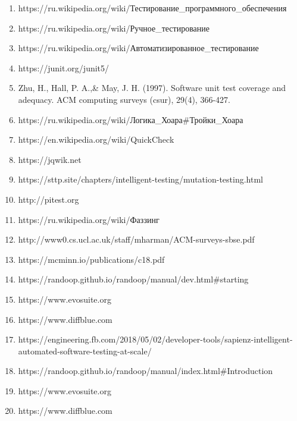 \begin{enumerate}

\item https://ru.wikipedia.org/wiki/Тестирование\_программного\_обеспечения
	
\item https://ru.wikipedia.org/wiki/Ручное\_тестирование

\item https://ru.wikipedia.org/wiki/Автоматизированное\_тестирование

\item https://junit.org/junit5/

\item Zhu, H., Hall, P. A.,\& May, J. H. (1997). Software unit test coverage and adequacy. ACM computing surveys (csur), 29(4), 366-427.

\item https://ru.wikipedia.org/wiki/Логика\_Хоара#Тройки\_Хоара

\item https://en.wikipedia.org/wiki/QuickCheck

\item https://jqwik.net

\item https://sttp.site/chapters/intelligent-testing/mutation-testing.html

\item http://pitest.org

\item https://ru.wikipedia.org/wiki/Фаззинг

\item http://www0.cs.ucl.ac.uk/staff/mharman/ACM-surveys-sbse.pdf

\item https://mcminn.io/publications/c18.pdf

\item https://randoop.github.io/randoop/manual/dev.html#starting

\item https://www.evosuite.org

\item https://www.diffblue.com

\item https://engineering.fb.com/2018/05/02/developer-tools/sapienz-intelligent-automated-software-testing-at-scale/

\item https://randoop.github.io/randoop/manual/index.html#Introduction 

\item https://www.evosuite.org 

\item https://www.diffblue.com


\end{enumerate}


